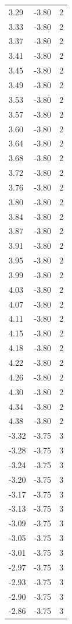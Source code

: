 \begin{longtable}{lrr}
  3.29 & -3.80 & 2 \\
  3.33 & -3.80 & 2 \\
  3.37 & -3.80 & 2 \\
  3.41 & -3.80 & 2 \\
  3.45 & -3.80 & 2 \\
  3.49 & -3.80 & 2 \\
  3.53 & -3.80 & 2 \\
  3.57 & -3.80 & 2 \\
  3.60 & -3.80 & 2 \\
  3.64 & -3.80 & 2 \\
  3.68 & -3.80 & 2 \\
  3.72 & -3.80 & 2 \\
  3.76 & -3.80 & 2 \\
  3.80 & -3.80 & 2 \\
  3.84 & -3.80 & 2 \\
  3.87 & -3.80 & 2 \\
  3.91 & -3.80 & 2 \\
  3.95 & -3.80 & 2 \\
  3.99 & -3.80 & 2 \\
  4.03 & -3.80 & 2 \\
  4.07 & -3.80 & 2 \\
  4.11 & -3.80 & 2 \\
  4.15 & -3.80 & 2 \\
  4.18 & -3.80 & 2 \\
  4.22 & -3.80 & 2 \\
  4.26 & -3.80 & 2 \\
  4.30 & -3.80 & 2 \\
  4.34 & -3.80 & 2 \\
  4.38 & -3.80 & 2 \\
  -3.32 & -3.75 & 3 \\
  -3.28 & -3.75 & 3 \\
  -3.24 & -3.75 & 3 \\
  -3.20 & -3.75 & 3 \\
  -3.17 & -3.75 & 3 \\
  -3.13 & -3.75 & 3 \\
  -3.09 & -3.75 & 3 \\
  -3.05 & -3.75 & 3 \\
  -3.01 & -3.75 & 3 \\
  -2.97 & -3.75 & 3 \\
  -2.93 & -3.75 & 3 \\
  -2.90 & -3.75 & 3 \\
  -2.86 & -3.75 & 3 \\

\end{longtable}
